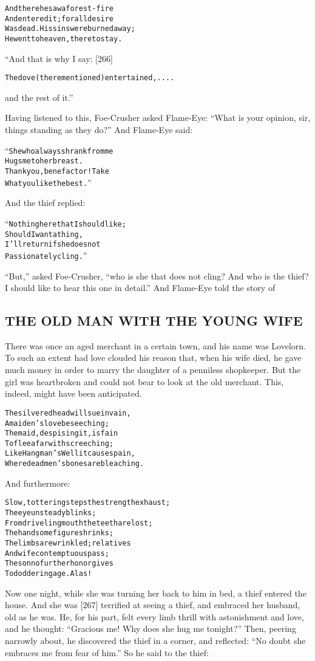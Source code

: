 \documentclass{article}
\renewenvironment{verbatim}{\begin{alltt}\normalfont\begin{centering}}{\end{centering}\end{alltt}}
\begin{document}
\begin{verbatim}
And there he saw a forest-fire
And entered it; for all desire
Was dead. His sins were burned away;
He went to heaven, there to stay.                       
\end{verbatim}
“And that is why I say: [266]

\begin{verbatim}
The dove (there mentioned) entertained, ....
\end{verbatim}
and the rest of it.”

Having listened to this, Foe-Crusher asked Flame-Eye:
``What is your opinion, sir, things standing as they do?'' And
Flame-Eye said:

\begin{verbatim}
“She who always shrank from me
Hugs me to her breast.
Thank you, benefactor! Take
What you like the best.”
\end{verbatim}
And the thief replied:

\begin{verbatim}
“Nothing here that I should like;
Should I want a thing,
I'll return if she does not
Passionately cling.”
\end{verbatim}
``But,'' asked Foe-Crusher,
``who is she that does not cling? And who is the thief? I should like to hear this one in detail.''
And Flame-Eye told the story of

\subsection{THE OLD MAN WITH THE YOUNG WIFE}

There was once an aged merchant in a certain town, and his name was
Lovelorn. To such an extent had love clouded his reason that, when
his wife died, he gave much money in order to marry the daughter of
a penniless shopkeeper. But the girl was heartbroken and could not
bear to look at the old merchant. This, indeed, might have been
anticipated.

\begin{verbatim}
The silvered head will sue in vain,
    A maiden's love beseeching;
The maid, despising it, is fain
    To flee afar with screeching;
Like Hangman's Well it causes pain,
    Where dead men's bones are bleaching.
\end{verbatim}
And furthermore:

\begin{verbatim}
Slow, tottering steps the strength exhaust;
    The eye unsteady blinks;
From driveling mouth the teeth are lost;
    The handsome figure shrinks;
The limbs are wrinkled; relatives
    And wife contemptuous pass;
The son no further honor gives
    To doddering age. Alas!
\end{verbatim}
Now one night, while she was turning her back to him in bed, a
thief entered the house. And she was [267] terrified at seeing a
thief, and embraced her husband, old as he was. He, for his part,
felt every limb thrill with astonishment and love, and he thought:
``Gracious me! Why does she hug me tonight?'' Then, peering
narrowly about, he discovered the thief in a corner, and reflected:
``No doubt she embraces me from fear of him.'' So he said to the
thief:
\end{document}

